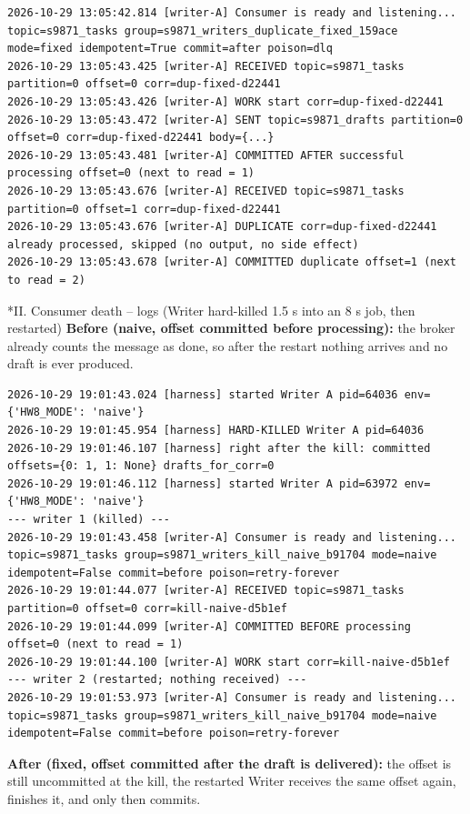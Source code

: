\documentclass[11pt]{article}
\makeatletter
\renewcommand\subsection{\@startsection{subsection}{2}{\z@}{-2.2ex \@plus -1ex \@minus -.2ex}{0.8ex \@plus.2ex}{\normalfont\fontsize{12}{14.5}\selectfont\bfseries}}
\makeatother
\begin{document}
\begingroup\lstset{basicstyle=\ttfamily\tiny}
\begin{lstlisting}
2026-10-29 13:05:42.814 [writer-A] Consumer is ready and listening... topic=s9871_tasks group=s9871_writers_duplicate_fixed_159ace mode=fixed idempotent=True commit=after poison=dlq
2026-10-29 13:05:43.425 [writer-A] RECEIVED topic=s9871_tasks partition=0 offset=0 corr=dup-fixed-d22441
2026-10-29 13:05:43.426 [writer-A] WORK start corr=dup-fixed-d22441
2026-10-29 13:05:43.472 [writer-A] SENT topic=s9871_drafts partition=0 offset=0 corr=dup-fixed-d22441 body={...}
2026-10-29 13:05:43.481 [writer-A] COMMITTED AFTER successful processing offset=0 (next to read = 1)
2026-10-29 13:05:43.676 [writer-A] RECEIVED topic=s9871_tasks partition=0 offset=1 corr=dup-fixed-d22441
2026-10-29 13:05:43.676 [writer-A] DUPLICATE corr=dup-fixed-d22441 already processed, skipped (no output, no side effect)
2026-10-29 13:05:43.678 [writer-A] COMMITTED duplicate offset=1 (next to read = 2)
\end{lstlisting}
\endgroup
\subsection*{II. Consumer death -- logs (Writer hard-killed 1.5 s into an 8 s job, then restarted)}
\textbf{Before (naive, offset committed before processing):} the broker already counts the message as done, so after the restart nothing arrives and no draft is ever produced.

\begingroup\lstset{basicstyle=\ttfamily\tiny}
\begin{lstlisting}
2026-10-29 19:01:43.024 [harness] started Writer A pid=64036 env={'HW8_MODE': 'naive'}
2026-10-29 19:01:45.954 [harness] HARD-KILLED Writer A pid=64036
2026-10-29 19:01:46.107 [harness] right after the kill: committed offsets={0: 1, 1: None} drafts_for_corr=0
2026-10-29 19:01:46.112 [harness] started Writer A pid=63972 env={'HW8_MODE': 'naive'}
--- writer 1 (killed) ---
2026-10-29 19:01:43.458 [writer-A] Consumer is ready and listening... topic=s9871_tasks group=s9871_writers_kill_naive_b91704 mode=naive idempotent=False commit=before poison=retry-forever
2026-10-29 19:01:44.077 [writer-A] RECEIVED topic=s9871_tasks partition=0 offset=0 corr=kill-naive-d5b1ef
2026-10-29 19:01:44.099 [writer-A] COMMITTED BEFORE processing offset=0 (next to read = 1)
2026-10-29 19:01:44.100 [writer-A] WORK start corr=kill-naive-d5b1ef
--- writer 2 (restarted; nothing received) ---
2026-10-29 19:01:53.973 [writer-A] Consumer is ready and listening... topic=s9871_tasks group=s9871_writers_kill_naive_b91704 mode=naive idempotent=False commit=before poison=retry-forever
\end{lstlisting}
\endgroup
\textbf{After (fixed, offset committed after the draft is delivered):} the offset is still uncommitted at the kill, the restarted Writer receives the same offset again, finishes it, and only then commits.
\end{document}

